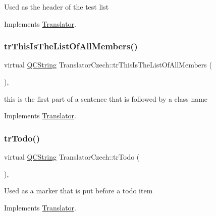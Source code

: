 Used as the header of the test list 

Implements \mbox{\hyperlink{class_translator}{Translator}}.

\mbox{\label{class_translator_czech_aab1bc5f442f1db8ea6ec079d5ec1804c}} 
\subsubsection{\texorpdfstring{trThisIsTheListOfAllMembers()}{trThisIsTheListOfAllMembers()}}
{\footnotesize\ttfamily virtual \mbox{\hyperlink{class_q_c_string}{Q\+C\+String}} Translator\+Czech\+::tr\+This\+Is\+The\+List\+Of\+All\+Members (\begin{DoxyParamCaption}{ }\end{DoxyParamCaption})\hspace{0.3cm}{\ttfamily [inline]}, {\ttfamily [virtual]}}

this is the first part of a sentence that is followed by a class name 

Implements \mbox{\hyperlink{class_translator}{Translator}}.

\mbox{\label{class_translator_czech_a81b2a6444aae79ffea6b1e8fd0aa6e18}} 
\subsubsection{\texorpdfstring{trTodo()}{trTodo()}}
{\footnotesize\ttfamily virtual \mbox{\hyperlink{class_q_c_string}{Q\+C\+String}} Translator\+Czech\+::tr\+Todo (\begin{DoxyParamCaption}{ }\end{DoxyParamCaption})\hspace{0.3cm}{\ttfamily [inline]}, {\ttfamily [virtual]}}

Used as a marker that is put before a todo item 

Implements \mbox{\hyperlink{class_translator}{Translator}}.

\mbox{\label{class_translator_czech_a9dea9ddff783bf07e7534eff4d306d35}} 
